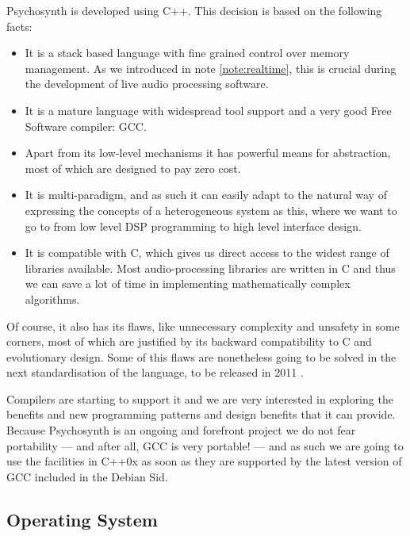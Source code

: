 Psychosynth is developed using C++. This decision is based on the
following facts:

\begin{itemize}
\item It is a stack based language with fine grained control over
  memory management. As we introduced in note \ref{note:realtime},
  this is crucial during the development of live audio processing
  software.

\item It is a mature language with widespread tool support and a very
  good Free Software compiler: GCC.

\item Apart from its low-level mechanisms it has powerful means for
  abstraction, most of which are designed to pay zero cost.

\item It is multi-paradigm, and as such it can easily adapt to the
  natural way of expressing the concepts of a heterogeneous system as
  this, where we want to go to from low level DSP programming to high
  level interface design.

\item It is compatible with C, which gives us direct access to the
  widest range of libraries available. Most audio-processing libraries
  are written in C and thus we can save a lot of time in
  implementing mathematically complex algorithms. 
\end{itemize}

Of course, it also has its flaws, like unnecessary complexity and
unsafety in some corners, most of which are justified by its backward
compatibility to C and evolutionary design. Some of this flaws are
nonetheless going to be solved in the next standardisation of the
language, to be released in 2011 \cite{herb10iso}.

Compilers are starting to support it and we are very interested in
exploring the benefits and new programming patterns and design
benefits that it can provide. Because Psychosynth is an ongoing and
forefront project we do not fear portability --- and after all, GCC is
very portable! --- and as such we are going to use the facilities in
C++0x as soon as they are supported by the latest version of GCC
included in the Debian Sid.

\subsection{Operating System}

